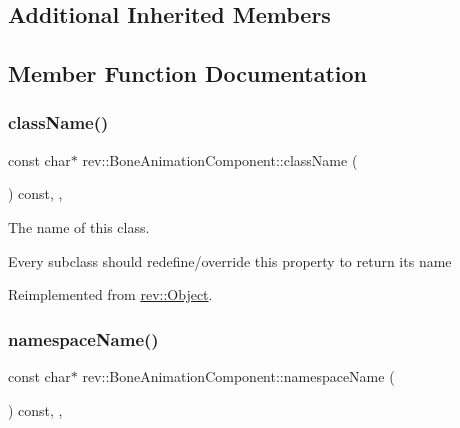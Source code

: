 \subsection*{Additional Inherited Members}


\subsection{Member Function Documentation}
\mbox{\label{classrev_1_1_bone_animation_component_a3eaa61a98c682a9b0f5aa804b448380b}} 
\subsubsection{\texorpdfstring{className()}{className()}}
{\footnotesize\ttfamily const char$\ast$ rev\+::\+Bone\+Animation\+Component\+::class\+Name (\begin{DoxyParamCaption}{ }\end{DoxyParamCaption}) const\hspace{0.3cm}{\ttfamily [inline]}, {\ttfamily [override]}, {\ttfamily [virtual]}}



The name of this class. 

Every subclass should redefine/override this property to return its name 

Reimplemented from \mbox{\hyperlink{classrev_1_1_object_a7a2013f91169479b65cf93afdc5d9a68}{rev\+::\+Object}}.

\mbox{\label{classrev_1_1_bone_animation_component_af7df4b639ac2c3e9048f44c159d0dcda}} 
\subsubsection{\texorpdfstring{namespaceName()}{namespaceName()}}
{\footnotesize\ttfamily const char$\ast$ rev\+::\+Bone\+Animation\+Component\+::namespace\+Name (\begin{DoxyParamCaption}{ }\end{DoxyParamCaption}) const\hspace{0.3cm}{\ttfamily [inline]}, {\ttfamily [override]}, {\ttfamily [virtual]}}




